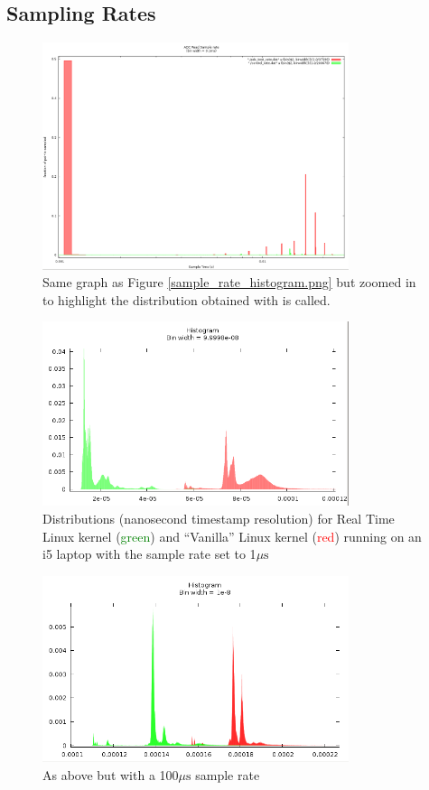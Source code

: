\subsection*{Sampling Rates}

\begin{figure}[H]
	\centering
	\includegraphics[width=0.8\textwidth]{figures/adc_histogram.png}
	\caption{Same graph as Figure \ref{sample_rate_histogram.png} but zoomed in to highlight the distribution obtained with  is called.}
\end{figure}


\begin{figure}[H]
	\centering
	\includegraphics[width=0.8\textwidth]{figures/rt_vs_normal_3-2-0-4-amd64_1e-6s.png}
	\caption{Distributions (nanosecond timestamp resolution) for Real Time Linux kernel (\textcolor{green}{green}) and ``Vanilla'' Linux kernel (\textcolor{red}{red}) running on an i5 laptop with the sample rate set to 1$\mu\text{s}$}
\end{figure}


\begin{figure}[H]
	\centering
	\includegraphics[width=0.8\textwidth]{figures/rt_vs_normal_3-2-0-4-amd64_1e-4s.png}
	\caption{As above but with a 100$\mu\text{s}$ sample rate}
\end{figure}


